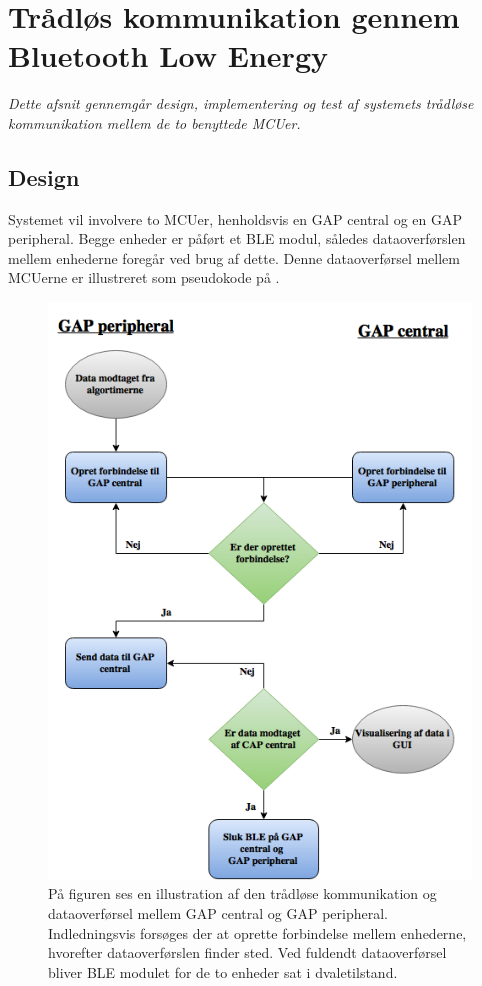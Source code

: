 \section{Trådløs kommunikation gennem Bluetooth Low Energy}
\textit{Dette afsnit gennemgår design, implementering og test af systemets trådløse kommunikation mellem de to benyttede MCUer.}

\subsection{Design}
Systemet vil involvere to MCUer, henholdsvis en GAP central og en GAP peripheral. Begge enheder er påført et BLE modul, således dataoverførslen mellem enhederne foregår ved brug af dette. Denne dataoverførsel mellem MCUerne er illustreret som pseudokode på . 
\begin{figure}[H]
	\centering
	\includegraphics[scale=0.5]{figures/cDesign/blue_pseudo.png}
	\caption{På figuren ses en illustration af den trådløse kommunikation og dataoverførsel mellem GAP central og GAP peripheral. Indledningsvis forsøges der at oprette forbindelse mellem enhederne, hvorefter dataoverførslen finder sted. Ved fuldendt dataoverførsel bliver BLE modulet for de to enheder sat i dvaletilstand.}
	\label{fig:blue_pseudo}
\end{figure}
